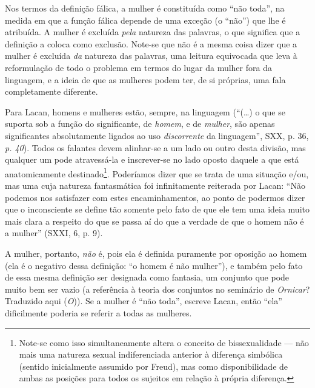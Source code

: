Nos termos da definição fálica, a mulher é constituída como ``não
toda'', na medida em que a função fálica depende de uma exceção (o
``não'') que lhe é atribuída. A mulher é excluída \emph{pela} natureza
das palavras, o que significa que a definição a coloca como exclusão.
Note-se que não é a mesma coisa dizer que a mulher é excluída \emph{da}
natureza das palavras, uma leitura equivocada que leva à reformulação de
todo o problema em termos do lugar da mulher fora da linguagem, e a
ideia de que as mulheres podem ter, de si próprias, uma fala
completamente diferente.

Para Lacan, homens e mulheres estão, sempre, na linguagem (``(\ldots{}) o que
se suporta sob a função do significante, de \emph{homem}, e de
\emph{mulher}, são apenas significantes absolutamente ligados ao uso
\emph{discorrente} da linguagem'', SXX, p. 36, \emph{p. 40}). Todos os
falantes devem alinhar-se a um lado ou outro desta divisão, mas qualquer
um pode atravessá-la e inscrever-se no lado oposto daquele a que está
anatomicamente destinado\footnote{Note-se como isso simultaneamente
  altera o conceito de bissexualidade --- não mais uma natureza sexual
  indiferenciada anterior à diferença simbólica (sentido inicialmente
  assumido por Freud), mas como disponibilidade de ambas as posições
  para todos os sujeitos em relação à própria diferença.}. Poderíamos
dizer que se trata de uma situação e/ou, mas uma cuja natureza
fantasmática foi infinitamente reiterada por Lacan: ``Não podemos nos
satisfazer com estes encaminhamentos, ao ponto de podermos dizer que o
inconsciente se define tão somente pelo fato de que ele tem uma ideia
muito mais clara a respeito do que se passa aí do que a verdade de que o
homem não é a mulher'' (SXXI, 6, p. 9).

A mulher, portanto, \emph{não} é, pois ela é definida puramente por
oposição ao homem (ela é o negativo dessa definição: ``o homem é não
mulher''), e também pelo fato de essa mesma definição ser designada como
fantasia, um conjunto que pode muito bem ser vazio (a referência à
teoria dos conjuntos no seminário de \emph{Ornicar}? Traduzido aqui
(\emph{O})). Se a mulher é ``não toda'', escreve Lacan, então ``ela''
dificilmente poderia se referir a todas as mulheres.

